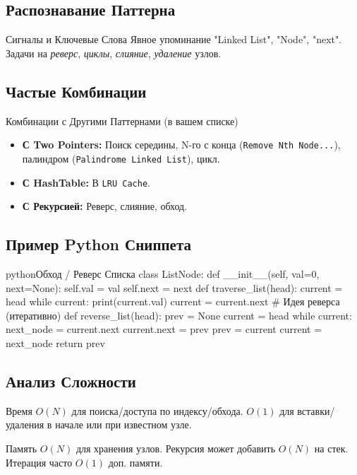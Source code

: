 \subsection{Распознавание Паттерна}
\begin{myblock}{Сигналы и Ключевые Слова}
    Явное упоминание "Linked List", "Node", "next". Задачи на \emph{реверс}, \emph{циклы}, \emph{слияние}, \emph{удаление} узлов.
\end{myblock}

\subsection{Частые Комбинации}
\begin{myblock}{Комбинации с Другими Паттернами (в вашем списке)}
    \begin{itemize}[nosep, leftmargin=*]
        \item \textbf{С Two Pointers:} Поиск середины, N-го с конца (\texttt{Remove Nth Node...}), палиндром (\texttt{Palindrome Linked List}), цикл.
        \item \textbf{С HashTable:} В \texttt{LRU Cache}.
        \item \textbf{С Рекурсией:} Реверс, слияние, обход.
    \end{itemize}
\end{myblock}

\subsection{Пример Python Сниппета}
\begin{codebox}{python}{Обход / Реверс Списка}
class ListNode:
    def __init__(self, val=0, next=None):
        self.val = val
        self.next = next
def traverse_list(head):
    current = head
    while current:
        print(current.val)
        current = current.next
# Идея реверса (итеративно)
def reverse_list(head):
    prev = None
    current = head
    while current:
        next_node = current.next
        current.next = prev
        prev = current
        current = next_node
    return prev
\end{codebox}

\subsection{Анализ Сложности}
\begin{myblock}{Время}
    $O(N)$ для поиска/доступа по индексу/обхода. $O(1)$ для вставки/удаления в начале или при известном узле.
\end{myblock}
\begin{myblock}{Память}
    $O(N)$ для хранения узлов. Рекурсия может добавить $O(N)$ на стек. Итерация часто $O(1)$ доп. памяти.
\end{myblock}

